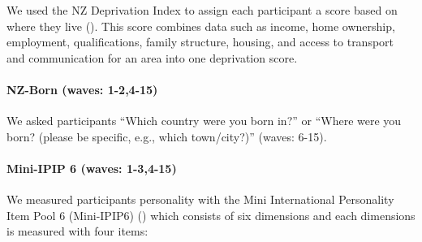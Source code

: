 \documentclass[
  singlecolumn,
  9pt]{article}
\let\oldparagraph\paragraph
\renewcommand{\paragraph}[1]{\oldparagraph{#1}\mbox{}}
\begin{document}
We used the NZ Deprivation Index to assign each participant a score
based on where they live (). This score combines data such as income, home ownership,
employment, qualifications, family structure, housing, and access to
transport and communication for an area into one deprivation score.

\paragraph{NZ-Born (waves: 1-2,4-15)}\label{nz-born-waves-1-24-15}

We asked participants ``Which country were you born in?'' or ``Where
were you born? (please be specific, e.g., which town/city?)'' (waves:
6-15).

\paragraph{Mini-IPIP 6 (waves:
1-3,4-15)}\label{mini-ipip-6-waves-1-34-15}

We measured participants personality with the Mini International
Personality Item Pool 6 (Mini-IPIP6) () which consists of six dimensions and each
dimensions is measured with four items:
\end{document}
